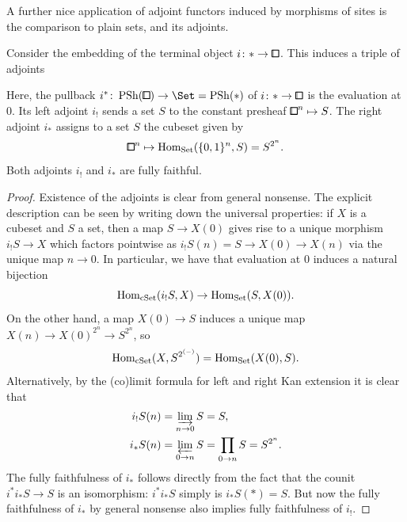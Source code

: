 A further nice application of adjoint functors induced by morphisms of sites is the comparison to plain sets, and its adjoints.

\begin{lemma}\label{lem:point-cset}
Consider the embedding of the terminal object $i\colon\ast\to\bbox$.
This induces a triple of adjoints
\begin{center}
\end{center}
Here, the pullback $i^\ast\colon\PSh(\bbox)\to \Set=\PSh(\ast)$ of $i\colon\ast\to\bbox$ is the evaluation at $0$.
Its left adjoint $i_!$ sends a set $S$ to the constant presheaf ${\bbox}^n\mapsto S$.
The right adjoint $i_\ast$ assigns to a set $S$ the cubeset given by
\[
    {\bbox}^n\mapsto\hom_{\set}(\{0,1\}^n,S) =  S^{2^n}.
\]
Both adjoints $i_!$ and $i_\ast$ are fully faithful.
\end{lemma}

\begin{proof}
Existence of the adjoints is clear from general nonsense.
The explicit description can be seen by writing down the universal properties:
if $X$ is a cubeset and $S$ a set, then a map $S\to X(0)$ gives rise to a unique morphism
$i_!S\to X$ which factors pointwise as $i_!S(n) = S \to X(0) \to X(n)$ via the unique map $n\to 0$.
In particular, we have that evaluation at $0$ induces a natural bijection
\[
    \operatorname{Hom}_{\mathrm{cSet}}(i_!S,X) \to \operatorname{Hom}_{\mathrm{Set}}(S,X(0)).
\]
On the other hand, a map $X(0)\to S$ induces a unique map $X(n)\to X(0)^{2^n}\to S^{2^n}$, so
\[
    \operatorname{Hom}_{\mathrm{cSet}}(X,S^{2^{(-)}}) = \operatorname{Hom}_{\mathrm{Set}}(X(0),S).
\]
Alternatively, by the (co)limit formula for left and right Kan extension it is clear that
\begin{align*}
    i_!S(n) &= \varinjlim_{n\to 0} S = S, \\
    i_\ast S(n) &= \varprojlim_{0\to n} S = \prod_{0\to n} S = S^{2^n}.
\end{align*}
The fully faithfulness of $i_\ast$ follows directly from the fact that the counit $i^\ast i_\ast S\to S$ is an isomorphism:
$i^\ast i_\ast S$ simply is $i_\ast S(\ast) = S$.
But now the fully faithfulness of $i_*$ by general nonsense also implies fully faithfulness of $i_!$.
\end{proof}


